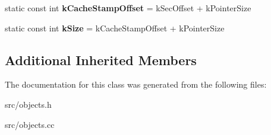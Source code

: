 \begin{DoxyCompactItemize}
\item 
\hypertarget{classv8_1_1internal_1_1_j_s_date_a9c1aa5942a2e169bae870d5150778dca}{}static const int {\bfseries k\+Cache\+Stamp\+Offset} = k\+Sec\+Offset + k\+Pointer\+Size\label{classv8_1_1internal_1_1_j_s_date_a9c1aa5942a2e169bae870d5150778dca}

\item 
\hypertarget{classv8_1_1internal_1_1_j_s_date_a9416fc77a4defa89edf9d7f92b2a8348}{}static const int {\bfseries k\+Size} = k\+Cache\+Stamp\+Offset + k\+Pointer\+Size\label{classv8_1_1internal_1_1_j_s_date_a9416fc77a4defa89edf9d7f92b2a8348}

\end{DoxyCompactItemize}
\subsection*{Additional Inherited Members}


The documentation for this class was generated from the following files\+:\begin{DoxyCompactItemize}
\item 
src/objects.\+h\item 
src/objects.\+cc\end{DoxyCompactItemize}
